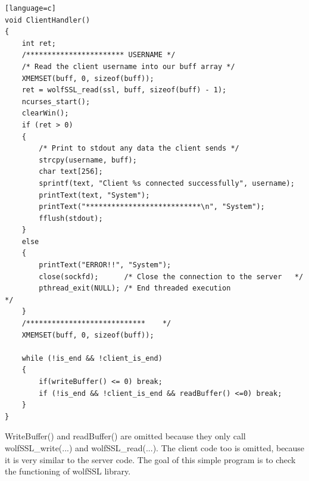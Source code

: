 \documentclass[a4paper,12pt]{article}
\begin{document}
\begin{lstlisting}[caption={void ClientHandler() of iterative TLS server},captionpos=b][language=c]
void ClientHandler()
{
    int ret;
    /*********************** USERNAME */
    /* Read the client username into our buff array */
    XMEMSET(buff, 0, sizeof(buff));
    ret = wolfSSL_read(ssl, buff, sizeof(buff) - 1);
    ncurses_start();
    clearWin();
    if (ret > 0)
    {
        /* Print to stdout any data the client sends */
        strcpy(username, buff);
        char text[256];
        sprintf(text, "Client %s connected successfully", username);
        printText(text, "System");
        printText("***************************\n", "System");
        fflush(stdout);
    }
    else
    {
        printText("ERROR!!", "System");
        close(sockfd);      /* Close the connection to the server   */
        pthread_exit(NULL); /* End threaded execution                */
    }
    /****************************    */
    XMEMSET(buff, 0, sizeof(buff));

    while (!is_end && !client_is_end)
    {
        if(writeBuffer() <= 0) break;
        if (!is_end && !client_is_end && readBuffer() <=0) break;
    }
}
\end{lstlisting}
WriteBuffer() and readBuffer() are omitted because they only call wolfSSL\_write(...) and wolfSSL\_read(...).
The client code too is omitted, because it is very similar to the server code.
The goal of this simple program is to check the functioning of wolfSSL library. 
\end{document}
